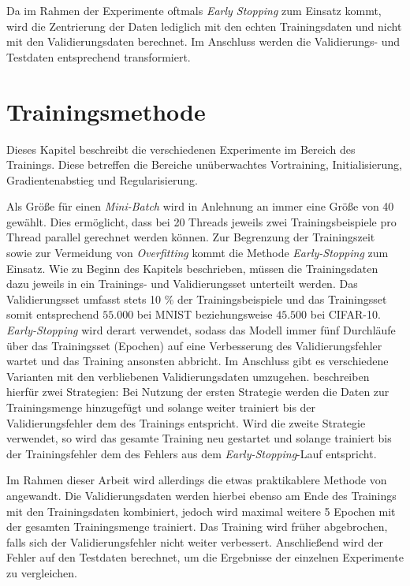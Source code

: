 Da im Rahmen der Experimente oftmals \textit{Early Stopping} zum Einsatz kommt, wird die Zentrierung der Daten lediglich mit den echten Trainingsdaten und nicht mit den Validierungsdaten berechnet. Im Anschluss werden die Validierungs- und Testdaten entsprechend transformiert. 


\section{Trainingsmethode}
Dieses Kapitel beschreibt die verschiedenen Experimente im Bereich des Trainings. Diese betreffen die Bereiche unüberwachtes Vortraining, Initialisierung, Gradientenabstieg und Regularisierung.

Als Größe für einen \textit{Mini-Batch} wird in Anlehnung an \cite{Bengio2012} immer eine Größe von 40 gewählt. Dies ermöglicht, dass bei 20 Threads jeweils zwei Trainingsbeispiele pro Thread parallel gerechnet werden können.
Zur Begrenzung der Trainingszeit sowie zur Vermeidung von \textit{Overfitting} kommt die Methode \textit{Early-Stopping} zum Einsatz. Wie zu Beginn des Kapitels beschrieben, müssen die Trainingsdaten dazu jeweils in ein Trainings- und Validierungsset unterteilt werden. Das Validierungsset umfasst stets 10 \% der Trainingsbeispiele und das Trainingsset somit entsprechend $55.000$ bei MNIST beziehungsweise $45.500$ bei CIFAR-10. \textit{Early-Stopping} wird derart verwendet, sodass das Modell immer fünf Durchläufe über das Trainingsset (Epochen) auf eine Verbesserung des Validierungsfehler wartet und das Training ansonsten abbricht. Im Anschluss gibt es verschiedene Varianten mit den verbliebenen Validierungsdaten umzugehen. \cite{Goodfellow_maxout_2013} beschreiben hierfür zwei Strategien: Bei Nutzung der ersten Strategie werden die Daten zur Trainingsmenge hinzugefügt und solange weiter trainiert bis der Validierungsfehler dem des Trainings entspricht. Wird die zweite Strategie verwendet, so wird das gesamte Training neu gestartet und solange trainiert bis der Trainingsfehler dem des Fehlers aus dem \textit{Early-Stopping}-Lauf entspricht. 

Im Rahmen dieser Arbeit wird allerdings die etwas praktikablere Methode von \cite{Ranzato2006} angewandt. Die Validierungsdaten werden hierbei ebenso am Ende des Trainings mit den Trainingsdaten kombiniert, jedoch wird maximal weitere 5 Epochen mit der gesamten Trainingsmenge trainiert. Das Training wird früher abgebrochen, falls sich der Validierungsfehler nicht weiter verbessert. Anschließend wird der Fehler auf den Testdaten berechnet, um die Ergebnisse der einzelnen Experimente zu vergleichen. 


